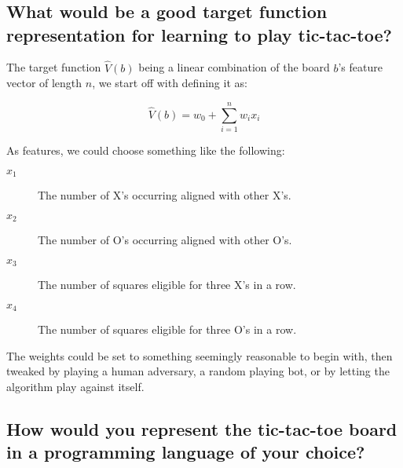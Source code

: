 \documentclass[11pt,a4paper]{article}
\begin{document}
        
        
    

  
  \section{} %
  \label{sec2}
  
    \subsection{What would be a good target function representation for learning to play tic-tac-toe?} %
    \label{sub:what_would_be_a_good_target_function_representation_for_learning_to_play_tic_tac_toe}
    
      The target function $\hat{V}(b)$ being a linear combination of the board $b$'s feature vector of length $n$, we start off with defining it as:
    
      \begin{equation}
        \hat{V}(b) = w_0 + \sum_{i=1}^n{w_i x_i}
      \end{equation}
    
      As features, we could choose something like the following:
    
      \begin{description}
        \item[$x_1$] The number of X's occurring aligned with other X's.
        \item[$x_2$] The number of O's occurring aligned with other O's.
        \item[$x_3$] The number of squares eligible for three X's in a row.
        \item[$x_4$] The number of squares eligible for three O's in a row.
      \end{description}
    
      The weights could be set to something seemingly reasonable to begin with, then tweaked by playing a human adversary, a random playing bot, or by letting the algorithm play against itself.
    
    
    \subsection{How would you represent the tic-tac-toe board in a programming language
of your choice?} %
    \label{sub:board_representation}
    
\end{document}
